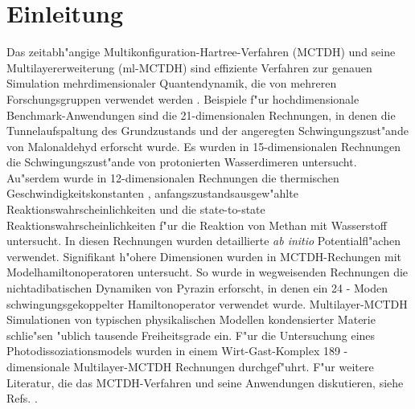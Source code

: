 \chapter{Einleitung}
\label{ch:einleitung}

Das zeitabh"angige Multikonfiguration-Hartree-Verfahren (MCTDH) 
\cite{MMC, MMC1} und seine Multilayererweiterung (ml-MCTDH)
\cite{WT3, Mreview2} 
sind effiziente Verfahren zur genauen Simulation mehrdimensionaler Quantendynamik,
die von mehreren Forschungsgruppen verwendet werden 
\cite{MCTDHex1, WestPNM, MCTDHex2, W1, MCTDHex4, MCTDHex5, MCTDHex6, MCTDHex7, MCTDHex8,
MCTDHex9, MCTDHex10, MCTDHex11, MCTDHex12, MCTDHex13, MCTDHex14, MCTDHex15, MCTDHex16, MCTDHex17,MCTDHex18}. 
Beispiele f"ur hochdimensionale 
Benchmark-Anwendungen sind die 21-dimen\-sio\-nalen Rechnungen, in denen die Tunnelaufspaltung des
Grundzustands \cite{CVM, HCVM, HaM1, MAMCTDH, HaM2, MAMCTDH2} und der angeregten \cite{HCVM, HaM1, MAMCTDH, HaM2, MAMCTDH2}
Schwingungszust"ande von Malonaldehyd erforscht wurde. 
Es wurden in 15-dimen\-sio\-nalen Rechnungen die Schwingungszust"ande von protonierten 
Wasserdi\-meren  \cite{H5O2+MCTDH, H5O2+MCTDH2, H5O2+MCTDH3, H5O2+MCTDH4, H5O2+MCTDH5} untersucht. 
Au"serdem wurde in 12-dimensionalen Rechnungen die thermischen 
Geschwindig\-keitskonstanten \cite{HM1, HM2, WWM, SM, vHNM,NvHM}, anfangszustandsausgew"ahlte Reaktionswahr\-scheinlichkeiten
\cite{SM02, SM04, WeM5, WeM6, WeM8} und die 
state-to-state Reaktionswahrscheinlichkeiten \cite{WeM7} f"ur die Reaktion von Methan mit Wasserstoff 
untersucht. In diesen Rechnungen wurden detaillierte \textit{ab initio} 
Potentialfl"achen verwendet. Signifikant h"ohere Dimensionen wurden in MCTDH-Rechungen mit 
Modelhamiltonoperatoren untersucht. So wurde in wegweisenden Rechnungen  
die nichtadibatischen Dynamiken von Pyrazin erforscht, in denen ein 24 - Moden 
schwingungsgekoppelter Hamiltonoperator \cite{WMC, WMC2, RWMC} verwendet wurde.
Multilayer-MCTDH Simulationen von typischen
physikalischen Modellen \cite{WT3, W1, WST, KCBWT, CTW2, WPHT} kondensierter Materie schlie"sen "ublich tausende Freiheitsgrade ein.
F"ur die Untersuchung eines Photodissoziationsmodels wurden in einem Wirt-Gast-Komplex 189 -
dimensionale Multilayer-MCTDH Rechnungen  durchgef"uhrt\cite{WBRSM}. F"ur weitere Literatur, die das MCTDH-Verfahren und
seine Anwendungen diskutieren, siehe Refs. \cite{MCTDHreview, MCTDHreview2, HMreview1, MCTDHbook,Mreview2011, MCTDHreview3}.

